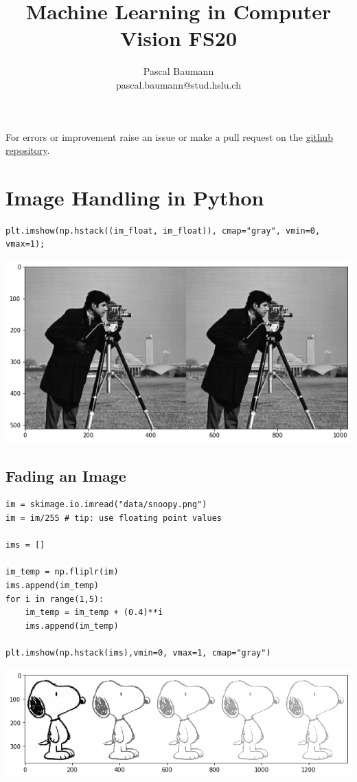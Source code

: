 \documentclass[x11names,11pt,a4paper]{article}
\theoremstyle{definition}
\begin{document}
	
\title{Machine Learning in Computer Vision FS20}
\author{Pascal Baumann\\pascal.baumann@stud.hslu.ch}
\maketitle



For errors or improvement raise an issue or make a pull request on the \href{https://github.com/KilnOfTheSecondFlame/mse_summaries}{github repository}.

\tableofcontents
\newpage


\section{Image Handling in Python}

\begin{verbatim}
plt.imshow(np.hstack((im_float, im_float)), cmap="gray", vmin=0, vmax=1);
\end{verbatim}

\begin{center}
	\includegraphics[width=0.7\linewidth]{img/hstack_image}
\end{center}

\subsection{Fading an Image}
\begin{verbatim}
im = skimage.io.imread("data/snoopy.png")
im = im/255 # tip: use floating point values

ims = []

im_temp = np.fliplr(im)
ims.append(im_temp)
for i in range(1,5):
	im_temp = im_temp + (0.4)**i
	ims.append(im_temp)

plt.imshow(np.hstack(ims),vmin=0, vmax=1, cmap="gray")
\end{verbatim}

\begin{center}
	\includegraphics[width=0.7\linewidth]{img/snoopy_fade}
\end{center}
\end{document}
